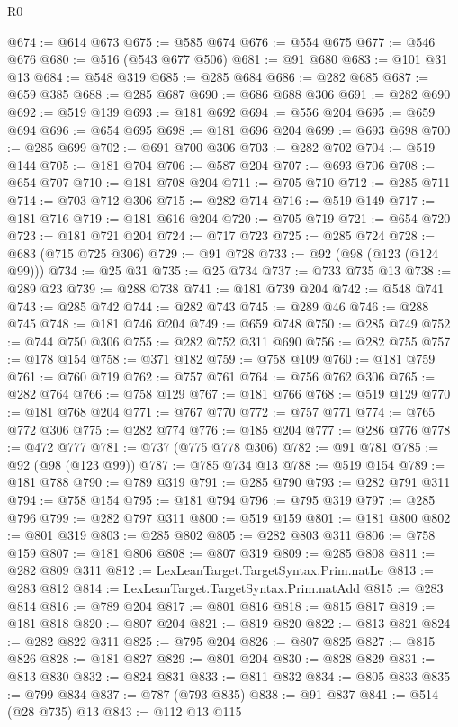 \begin{lexlean}{R0}
\begin{coremodule}
@674 := @614 @673
@675 := @585 @674
@676 := @554 @675
@677 := @546 @676
@680 := @516 (@543 @677 @506)
@681 := @91 @680
@683 := @101 @31 @13
@684 := @548 @319
@685 := @285 @684
@686 := @282 @685
@687 := @659 @385
@688 := @285 @687
@690 := @686 @688 @306
@691 := @282 @690
@692 := @519 @139
@693 := @181 @692
@694 := @556 @204
@695 := @659 @694
@696 := @654 @695
@698 := @181 @696 @204
@699 := @693 @698
@700 := @285 @699
@702 := @691 @700 @306
@703 := @282 @702
@704 := @519 @144
@705 := @181 @704
@706 := @587 @204
@707 := @693 @706
@708 := @654 @707
@710 := @181 @708 @204
@711 := @705 @710
@712 := @285 @711
@714 := @703 @712 @306
@715 := @282 @714
@716 := @519 @149
@717 := @181 @716
@719 := @181 @616 @204
@720 := @705 @719
@721 := @654 @720
@723 := @181 @721 @204
@724 := @717 @723
@725 := @285 @724
@728 := @683 (@715 @725 @306)
@729 := @91 @728
@733 := @92 (@98 (@123 (@124 @99)))
@734 := @25 @31
@735 := @25 @734
@737 := @733 @735 @13
@738 := @289 @23
@739 := @288 @738
@741 := @181 @739 @204
@742 := @548 @741
@743 := @285 @742
@744 := @282 @743
@745 := @289 @46
@746 := @288 @745
@748 := @181 @746 @204
@749 := @659 @748
@750 := @285 @749
@752 := @744 @750 @306
@755 := @282 @752 @311 @690
@756 := @282 @755
@757 := @178 @154
@758 := @371 @182
@759 := @758 @109
@760 := @181 @759
@761 := @760 @719
@762 := @757 @761
@764 := @756 @762 @306
@765 := @282 @764
@766 := @758 @129
@767 := @181 @766
@768 := @519 @129
@770 := @181 @768 @204
@771 := @767 @770
@772 := @757 @771
@774 := @765 @772 @306
@775 := @282 @774
@776 := @185 @204
@777 := @286 @776
@778 := @472 @777
@781 := @737 (@775 @778 @306)
@782 := @91 @781
@785 := @92 (@98 (@123 @99))
@787 := @785 @734 @13
@788 := @519 @154
@789 := @181 @788
@790 := @789 @319
@791 := @285 @790
@793 := @282 @791 @311
@794 := @758 @154
@795 := @181 @794
@796 := @795 @319
@797 := @285 @796
@799 := @282 @797 @311
@800 := @519 @159
@801 := @181 @800
@802 := @801 @319
@803 := @285 @802
@805 := @282 @803 @311
@806 := @758 @159
@807 := @181 @806
@808 := @807 @319
@809 := @285 @808
@811 := @282 @809 @311
@812 := LexLeanTarget.TargetSyntax.Prim.natLe
@813 := @283 @812
@814 := LexLeanTarget.TargetSyntax.Prim.natAdd
@815 := @283 @814
@816 := @789 @204
@817 := @801 @816
@818 := @815 @817
@819 := @181 @818
@820 := @807 @204
@821 := @819 @820
@822 := @813 @821
@824 := @282 @822 @311
@825 := @795 @204
@826 := @807 @825
@827 := @815 @826
@828 := @181 @827
@829 := @801 @204
@830 := @828 @829
@831 := @813 @830
@832 := @824 @831
@833 := @811 @832
@834 := @805 @833
@835 := @799 @834
@837 := @787 (@793 @835)
@838 := @91 @837
@841 := @514 (@28 @735) @13
@843 := @112 @13 @115

\end{coremodule}
\end{lexlean}
